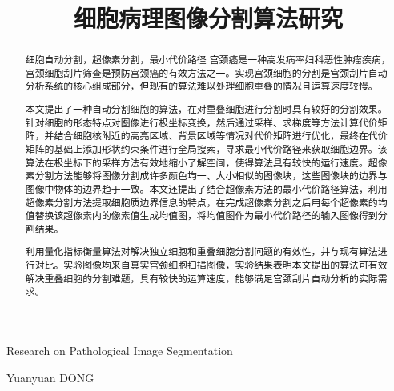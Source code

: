 \documentclass[nomlist,masters]{seuthesix}
\begin{document}
\title{细胞病理图像分割算法研究}{}{Research on Pathological Image Segmentation}{}
\author{}{Yuanyuan DONG}
\authorizedate{\today}
\committeechair{}
\reviewer{}{}
\makebigcover
\makecover
\begin{abstract}{细胞自动分割，超像素分割，最小代价路径}
宫颈癌是一种高发病率妇科恶性肿瘤疾病，宫颈细胞刮片筛查是预防宫颈癌的有效方法之一。实现宫颈细胞的分割是宫颈刮片自动分析系统的核心组成部分，但现有的算法难以处理细胞重叠的情况且运算速度较慢。

本文提出了一种自动分割细胞的算法，在对重叠细胞进行分割时具有较好的分割效果。针对细胞的形态特点对图像进行极坐标变换，然后通过采样、求梯度等方法计算代价矩阵，并结合细胞核附近的高亮区域、背景区域等情况对代价矩阵进行优化，最终在代价矩阵的基础上添加形状约束条件进行全局搜索，寻求最小代价路径来获取细胞边界。该算法在极坐标下的采样方法有效地缩小了解空间，使得算法具有较快的运行速度。超像素分割方法能够将图像分割成许多颜色均一、大小相似的图像块，这些图像块的边界与图像中物体的边界趋于一致。本文还提出了结合超像素方法的最小代价路径算法，利用超像素分割方法提取细胞质边界信息的特点，在完成超像素分割之后用每个超像素的均值替换该超像素内的像素值生成均值图，将均值图作为最小代价路径的输入图像得到分割结果。

利用量化指标衡量算法对解决独立细胞和重叠细胞分割问题的有效性，并与现有算法进行对比。实验图像均来自真实宫颈细胞扫描图像，实验结果表明本文提出的算法可有效解决重叠细胞的分割难题，具有较快的运算速度，能够满足宫颈刮片自动分析的实际需求。

\end{abstract}
\end{document}
